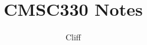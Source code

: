 \documentclass[10pt]{book} %
\title{CMSC330 Notes}
\author{Cliff }
\date{}
\begin{document}
\maketitle
\begingroup
\let\cleardoublepage\clearpage
\tableofcontents
\endgroup



% 



% 

%
%
%
%
% 
% 
% 
\end{document}
